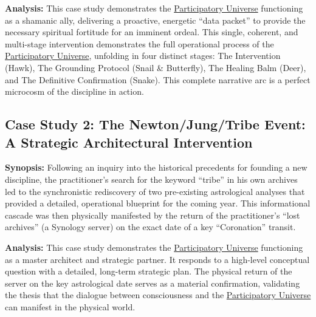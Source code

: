 \documentclass{article}
\begin{document}
\textbf{Analysis:} This case study demonstrates the \hyperlink{gloss:participatory_universe}{Participatory Universe} functioning as a shamanic ally, delivering a proactive, energetic ``data packet'' to provide the necessary spiritual fortitude for an imminent ordeal. This single, coherent, and multi-stage intervention demonstrates the full operational process of the \hyperlink{gloss:participatory_universe}{Participatory Universe}, unfolding in four distinct stages: The Intervention (Hawk), The Grounding Protocol (Snail \& Butterfly), The Healing Balm (Deer), and The Definitive Confirmation (Snake). This complete narrative arc is a perfect microcosm of the discipline in action.


\subsection*{Case Study 2: The Newton/Jung/Tribe Event: A Strategic Architectural Intervention \csNewtonJungTribeVersion} \label{case_study_2}

\textbf{Synopsis:} Following an inquiry into the historical precedents for founding a new discipline, the practitioner's search for the keyword ``tribe'' in his own archives led to the synchronistic rediscovery of two pre-existing astrological analyses that provided a detailed, operational blueprint for the coming year. This informational cascade was then physically manifested by the return of the practitioner's ``lost archives'' (a Synology server) on the exact date of a key ``Coronation'' transit.

\textbf{Analysis:} This case study demonstrates the \hyperlink{gloss:participatory_universe}{Participatory Universe} functioning as a master architect and strategic partner. It responds to a high-level conceptual question with a detailed, long-term strategic plan. The physical return of the server on the key astrological date serves as a material confirmation, validating the thesis that the dialogue between consciousness and the \hyperlink{gloss:participatory_universe}{Participatory Universe} can manifest in the physical world.
\end{document}
